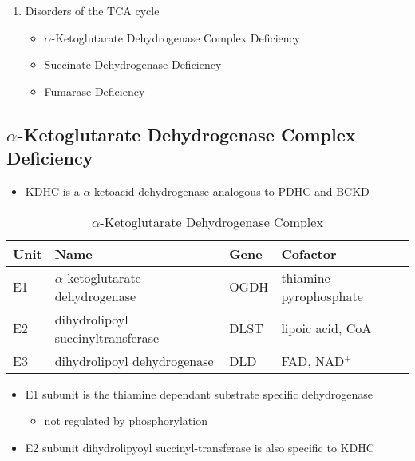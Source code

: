 \documentclass{scrartcl}
\begin{document}
\begin{enumerate}
\item Disorders of the TCA cycle
\label{sec:org1fd0b50}

\begin{itemize}
\item \(\alpha\)-Ketoglutarate Dehydrogenase Complex Deficiency
\item Succinate Dehydrogenase Deficiency
\item Fumarase Deficiency
\end{itemize}
\end{enumerate}

\subsection{\(\alpha\)-Ketoglutarate Dehydrogenase Complex Deficiency}
\label{sec:org5051e09}
\begin{itemize}
\item KDHC is a \(\alpha\)-ketoacid dehydrogenase analogous to PDHC and BCKD
\end{itemize}


\begin{table}[htbp]
\caption{\label{tab:orgdd93228}
\(\alpha\)-Ketoglutarate Dehydrogenase Complex}
\centering
\begin{tabular}{llll}
Unit & Name & Gene & Cofactor\\
\hline
E1 & \(\alpha\)-ketoglutarate dehydrogenase & OGDH & thiamine pyrophosphate\\
E2 & dihydrolipoyl succinyltransferase & DLST & lipoic acid, CoA\\
E3 & dihydrolipoyl dehydrogenase & DLD & FAD, NAD\(^{\text{+}}\)\\
\end{tabular}
\end{table}

\begin{itemize}
\item E1 subunit is the thiamine dependant substrate specific dehydrogenase
\begin{itemize}
\item not regulated by phosphorylation
\end{itemize}
\item E2 subunit dihydrolipyoyl succinyl-transferase is also specific to KDHC
\end{itemize}
\end{document}

